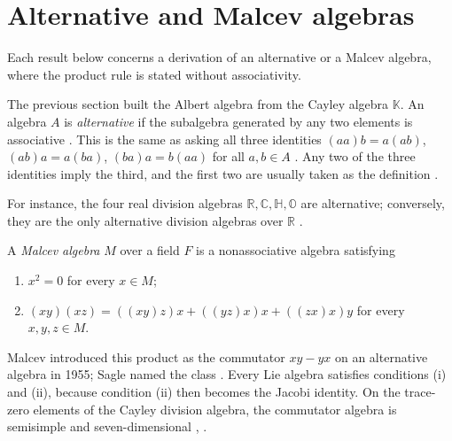 \section{Alternative and Malcev algebras}\label{sec:nonassociative:alternative}

Each result below concerns a derivation of an alternative or a Malcev algebra, where the product rule is stated without associativity.

The previous section built the Albert algebra from the Cayley algebra %
$\mathbb{K}$. An algebra $A$ is
\emph{alternative} if the subalgebra generated by any two elements is
associative \cite[p.~148]{Baez2002Octonions}. This is the same as asking
all three identities $(aa)b=a(ab)$, $(ab)a=a(ba)$, $(ba)a=b(aa)$ for all
$a,b\in A$ \cite[p.~148]{Baez2002Octonions}. Any two of the three
identities imply the third, and the first two are usually taken as the
definition \cite[p.~148]{Baez2002Octonions}.

For instance, the four real division algebras $\mathbb{R},\mathbb{C},
\mathbb{H},\mathbb{O}$ are alternative; conversely, they are the only
alternative division algebras over $\mathbb{R}$ \cite[Theorem,
p.~148]{Baez2002Octonions}.

\begin{definition}
\label{def:nonassociative:malcev}
A \emph{Malcev algebra} $M$ over a field $F$ is a nonassociative algebra
satisfying
\begin{enumerate}
\item [(i)] $x^{2}=0$ for every $x\in M$;
\item [(ii)] $(xy)(xz) = ((xy)z)x+((yz)x)x+((zx)x)y$ for every $x,y,z\in
M$.
\end{enumerate}
\end{definition}

Malcev introduced this product as the commutator $xy-yx$ on an
alternative algebra in 1955; Sagle named the class
\cite[p.~565]{Davenport1972Malcev}. Every Lie algebra satisfies
conditions (i) and (ii), because condition (ii) then becomes the Jacobi
identity. On the trace-zero elements of the Cayley division algebra,
the commutator algebra is semisimple and seven-dimensional
\cite[p.~148]{Baez2002Octonions}, \cite[p.~52]{McCrimmon2004Taste}. %

